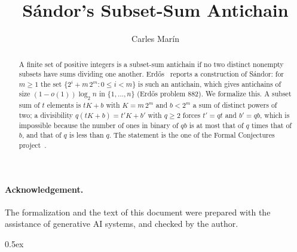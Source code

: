 \documentclass[10pt,a4paper]{article}
\begin{document}
\title{S\'andor's Subset-Sum Antichain}
\author{Carles Mar\'in}
\maketitle

\begin{abstract}
A finite set of positive integers is a subset-sum antichain if no two distinct nonempty subsets have sums
dividing one another. Erd\H{o}s~\cite{Er98} reports a construction of S\'andor: for $m\ge 1$ the set
$\{2^i+m\,2^m : 0\le i<m\}$ is such an antichain, which gives antichains of size $(1-o(1))\log_2 n$ in
$\{1,\dots,n\}$ (Erd\H{o}s problem 882). We formalize this. A subset sum of $t$ elements is $tK+b$ with
$K=m\,2^m$ and $b<2^m$ a sum of distinct powers of two; a divisibility $q(tK+b)=t'K+b'$ with $q\ge 2$ forces
$t'=qt$ and $b'=qb$, which is impossible because the number of ones in binary of $qb$ is at most that of $q$
times that of $b$, and that of $q$ is less than $q$. The statement is the one of the Formal Conjectures
project~\cite{FC}.
\end{abstract}

\paragraph{Acknowledgement.} The formalization and the text of this document were prepared with the
assistance of generative AI systems, and checked by the author.

\tableofcontents

\parindent 0pt\parskip 0.5ex





\end{document}
